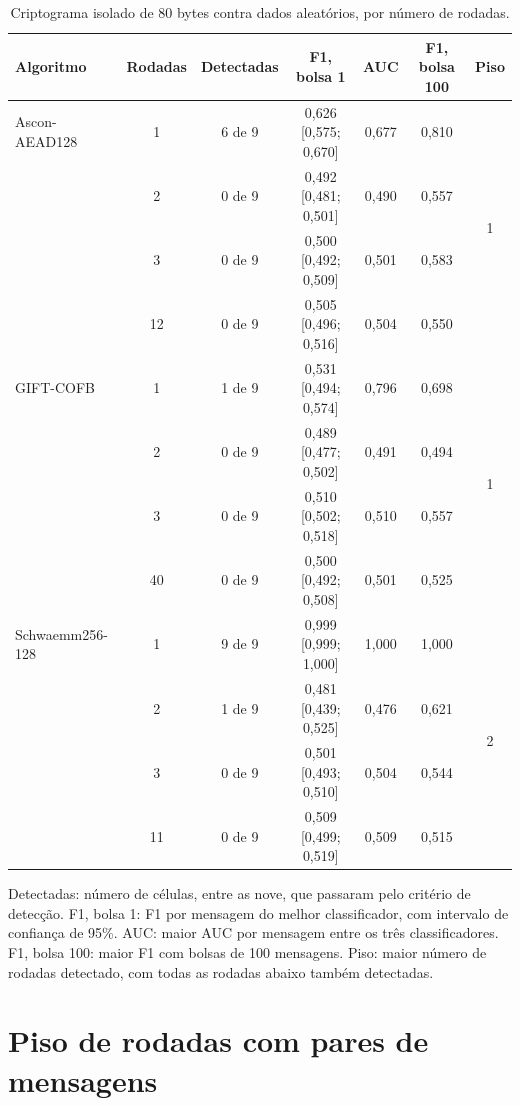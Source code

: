 \begin{table}[htb]
\centering
\caption{Criptograma isolado de 80 bytes contra dados aleatórios, por número de rodadas.}
\label{tab:res-isolado-curto}
\footnotesize
\setlength{\tabcolsep}{4pt}
\begin{tabular}{lcccccc}
\toprule
Algoritmo & Rodadas & Detectadas & F1, bolsa 1 & AUC & F1, bolsa 100 & Piso \\
\midrule
Ascon-AEAD128   & 1  & 6 de 9 & 0,626 [0,575; 0,670] & 0,677 & 0,810 & \multirow{4}{*}{1} \\
                & 2  & 0 de 9 & 0,492 [0,481; 0,501] & 0,490 & 0,557 & \\
                & 3  & 0 de 9 & 0,500 [0,492; 0,509] & 0,501 & 0,583 & \\
                & 12 & 0 de 9 & 0,505 [0,496; 0,516] & 0,504 & 0,550 & \\
\midrule
GIFT-COFB       & 1  & 1 de 9 & 0,531 [0,494; 0,574] & 0,796 & 0,698 & \multirow{4}{*}{1} \\
                & 2  & 0 de 9 & 0,489 [0,477; 0,502] & 0,491 & 0,494 & \\
                & 3  & 0 de 9 & 0,510 [0,502; 0,518] & 0,510 & 0,557 & \\
                & 40 & 0 de 9 & 0,500 [0,492; 0,508] & 0,501 & 0,525 & \\
\midrule
Schwaemm256-128 & 1  & 9 de 9 & 0,999 [0,999; 1,000] & 1,000 & 1,000 & \multirow{4}{*}{2} \\
                & 2  & 1 de 9 & 0,481 [0,439; 0,525] & 0,476 & 0,621 & \\
                & 3  & 0 de 9 & 0,501 [0,493; 0,510] & 0,504 & 0,544 & \\
                & 11 & 0 de 9 & 0,509 [0,499; 0,519] & 0,509 & 0,515 & \\
\bottomrule
\end{tabular}
\par\smallskip\footnotesize Detectadas: número de células, entre as nove, que passaram pelo critério de detecção. F1, bolsa 1: F1 por mensagem do melhor classificador, com intervalo de confiança de 95\%. AUC: maior AUC por mensagem entre os três classificadores. F1, bolsa 100: maior F1 com bolsas de 100 mensagens. Piso: maior número de rodadas detectado, com todas as rodadas abaixo também detectadas.

\end{table}




\section{Piso de rodadas com pares de mensagens}
\label{sec:res-piso}

